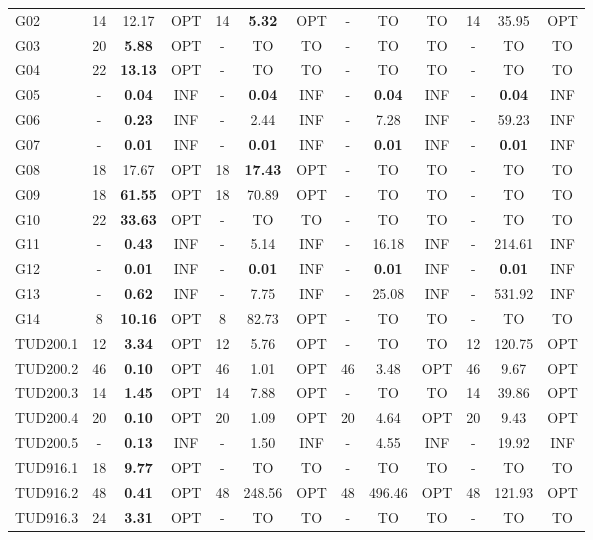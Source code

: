 \documentclass[letterpaper,journal]{IEEEtran}
\begin{document}
\begin{table}[htbp]
{\begin{tabular}{l ccc ccc ccc ccc}
G02 & 14 & 12.17 & OPT & 14 & \textbf{5.32} & OPT & - & TO & TO & 14 & 35.95 & OPT \\
G03 & 20 & \textbf{5.88} & OPT & - & TO & TO & - & TO & TO & - & TO & TO \\
G04 & 22 & \textbf{13.13} & OPT & - & TO & TO & - & TO & TO & - & TO & TO \\
G05 & - & \textbf{0.04} & INF & - & \textbf{0.04} & INF & - & \textbf{0.04} & INF & - & \textbf{0.04} & INF \\
G06 & - & \textbf{0.23} & INF & - & 2.44 & INF & - & 7.28 & INF & - & 59.23 & INF \\
G07 & - & \textbf{0.01} & INF & - & \textbf{0.01} & INF & - & \textbf{0.01} & INF & - & \textbf{0.01} & INF \\
G08 & 18 & 17.67 & OPT & 18 & \textbf{17.43} & OPT & - & TO & TO & - & TO & TO \\
G09 & 18 & \textbf{61.55} & OPT & 18 & 70.89 & OPT & - & TO & TO & - & TO & TO \\
G10 & 22 & \textbf{33.63} & OPT & - & TO & TO & - & TO & TO & - & TO & TO \\
G11 & - & \textbf{0.43} & INF & - & 5.14 & INF & - & 16.18 & INF & - & 214.61 & INF \\
G12 & - & \textbf{0.01} & INF & - & \textbf{0.01} & INF & - & \textbf{0.01} & INF & - & \textbf{0.01} & INF \\
G13 & - & \textbf{0.62} & INF & - & 7.75 & INF & - & 25.08 & INF & - & 531.92 & INF \\
G14 & 8 & \textbf{10.16} & OPT & 8 & 82.73 & OPT & - & TO & TO & - & TO & TO \\
TUD200.1 & 12 & \textbf{3.34} & OPT & 12 & 5.76 & OPT & - & TO & TO & 12 & 120.75 & OPT \\
TUD200.2 & 46 & \textbf{0.10} & OPT & 46 & 1.01 & OPT & 46 & 3.48 & OPT & 46 & 9.67 & OPT \\
TUD200.3 & 14 & \textbf{1.45} & OPT & 14 & 7.88 & OPT & - & TO & TO & 14 & 39.86 & OPT \\
TUD200.4 & 20 & \textbf{0.10} & OPT & 20 & 1.09 & OPT & 20 & 4.64 & OPT & 20 & 9.43 & OPT \\
TUD200.5 & - & \textbf{0.13} & INF & - & 1.50 & INF & - & 4.55 & INF & - & 19.92 & INF \\
TUD916.1 & 18 & \textbf{9.77} & OPT & - & TO & TO & - & TO & TO & - & TO & TO \\
TUD916.2 & 48 & \textbf{0.41} & OPT & 48 & 248.56 & OPT & 48 & 496.46 & OPT & 48 & 121.93 & OPT \\
TUD916.3 & 24 & \textbf{3.31} & OPT & - & TO & TO & - & TO & TO & - & TO & TO \\

\end{tabular}}
\end{table}
\end{document}

